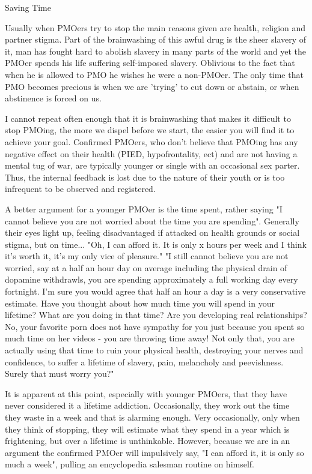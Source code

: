Saving Time

Usually when PMOers try to stop the main reasons given are health, religion and partner stigma. Part of the brainwashing of this awful drug is the sheer slavery of it, man has fought hard to abolish slavery in many parts of the world and yet the PMOer spends his life suffering self-imposed slavery. Oblivious to the fact that when he is allowed to PMO he wishes he were a non-PMOer. The only time that PMO becomes precious is when we are 'trying' to cut down or abstain, or when abstinence is forced on us.

I cannot repeat often enough that it is brainwashing that makes it difficult to stop PMOing, the more we dispel before we start, the easier you will find it to achieve your goal. Confirmed PMOers, who don't believe that PMOing has any negative effect on their health (PIED, hypofrontality, ect) and are not having a mental tug of war, are typically younger or single with an occasional sex parter. Thus, the internal feedback is lost due to the nature of their youth or is too infrequent to be observed and registered.

A better argument for a younger PMOer is the time spent, rather saying "I cannot believe you are not worried about the time you are spending". Generally their eyes light up, feeling disadvantaged if attacked on health grounds or social stigma, but on time...
  "Oh, I can afford it. It is only x hours per week and I think it's worth it, it's my only vice of pleasure."
  "I still cannot believe you are not worried, say at a half an hour day on average including the physical drain of dopamine withdrawls, you are spending approximately a full working day every fortnight. I'm sure you would agree that half an hour a day is a very conservative estimate. Have you thought about how much time you will spend in your lifetime? What are you doing in that time? Are you developing real relationships? No, your favorite porn does not have sympathy for you just because you spent so much time on her videos - you are throwing time away! Not only that, you are actually using that time to ruin your physical health, destroying your nerves and confidence, to suffer a lifetime of slavery, pain, melancholy and peevishness. Surely that must worry you?"

It is apparent at this point, especially with younger PMOers, that they have never considered it a lifetime addiction. Occasionally, they work out the time they waste in a week and that is alarming enough. Very occasionally, only when they think of stopping, they will estimate what they spend in a year which is frightening, but over a lifetime is unthinkable. However, because we are in an argument the confirmed PMOer will impulsively say, "I can afford it, it is only so much a week", pulling an encyclopedia salesman routine on himself.

